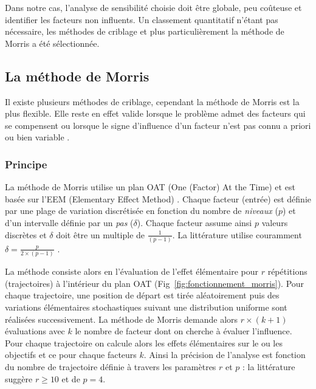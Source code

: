 Dans notre cas, l’analyse de sensibilité choisie doit être globale, peu coûteuse
et identifier les facteurs non influents. Un classement quantitatif n’étant pas
nécessaire, les méthodes de criblage et plus particulièrement la méthode de Morris
a été sélectionnée.



\subsection{La méthode de Morris} %
\label{sub:la_methode_de_morris}
Il existe plusieurs méthodes de criblage, cependant la méthode de Morris \parencite{Morris1991161}
est la plus flexible. Elle reste en effet valide lorsque le problème admet des facteurs
qui se compensent ou lorsque le signe d’influence d’un facteur n’est pas connu a priori
ou bien variable \parencite{Saltelli2004}.


\subsubsection{Principe} %
\label{ssub:principe}
La méthode de Morris utilise un plan OAT (One (Factor) At the Time) et est basée sur
l’EEM (Elementary Effect Method) \parencite{Saltelli2004}.
Chaque facteur (entrée) est définie par une plage de variation discrétisée en fonction
du nombre de \emph{niveaux} ($p$) et d’un intervalle définie par un \emph{pas} ($\delta$).
Chaque facteur assume ainsi $p$ valeurs discrètes et $\delta$ doit être un multiple de
$\frac{1}{(p - 1)}$. La littérature utilise couramment $\delta = \frac{p}{2 \times (p - 1)}$
\parencite{Morris1991161, Campolongo20071509}.

La méthode consiste alors en l’évaluation de l’effet élémentaire pour $r$ répétitions
(trajectoires) à l’intérieur du plan OAT (Fig~\ref{fig:fonctionnement_morris}). Pour
chaque trajectoire, une position de départ est tirée aléatoirement puis des variations
élémentaires stochastiques suivant une distribution uniforme sont réalisées
successivement. La méthode de Morris demande alors $r \times (k + 1)$ évaluations avec $k$
le nombre de facteur dont on cherche à évaluer l’influence. Pour chaque trajectoire on
calcule alors les effets élémentaires sur le ou les objectifs et ce pour chaque facteurs
$k$. Ainsi la précision de l’analyse est fonction du nombre de trajectoire définie à
travers les paramètres $r$ et $p$ : la littérature suggère $r \geq 10$ et de $p = 4$.

